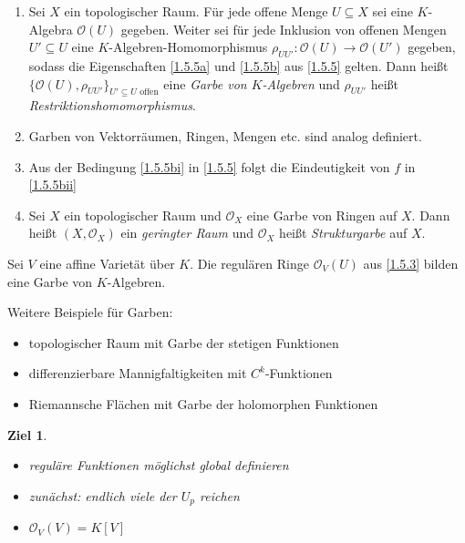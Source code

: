 \documentclass[a4paper,12pt]{scrbook}
\newtheorem{ziel}{Ziel}
\def\O{\mathcal{O}}
\newcommand{\ra}{\longrightarrow}
\begin{document}
\begin{dfn}\label{1.5.6}
  \begin{enumerate}
  \item Sei $X$ ein topologischer Raum. Für jede offene Menge $U\subseteq X$ sei eine $K$-Algebra $\O(U)$ gegeben. Weiter sei
    für jede Inklusion von offenen Mengen $U'\subseteq U$ eine $K$-Algebren-Homomorphismus $\rho_{UU'}\colon\O(U)\ra\O(U')$
    gegeben, sodass die Eigenschaften \ref{1.5.5a} und \ref{1.5.5b} aus \cref{1.5.5} gelten. Dann heißt
    $\{\O(U),\rho_{UU'}\}_{U'\subseteq U\text{ offen}}$ eine \emph{Garbe von $K$-Algebren} und $\rho_{UU'}$ heißt
    \emph{Restriktionshomomorphismus}.
  \item Garben von Vektorräumen, Ringen, Mengen etc. sind analog definiert.
  \item Aus der Bedingung \ref{1.5.5bi} in \cref{1.5.5} folgt die Eindeutigkeit von $f$ in \ref{1.5.5bii}
  \item Sei $X$ ein topologischer Raum und $\O_X$ eine Garbe von Ringen auf $X$. Dann heißt $(X,\O_X)$ ein \emph{geringter Raum}
    und $\O_X$ heißt \emph{Strukturgarbe} auf $X$.
  \end{enumerate}
\end{dfn}

\begin{bem}\label{1.5.7}
  Sei $V$ eine affine Varietät über $K$. Die regulären Ringe $\O_V(U)$ aus \cref{1.5.3} bilden eine Garbe von $K$-Algebren.
\end{bem}

\begin{bsp}\label{1.5.8}
  Weitere Beispiele für Garben:
  \begin{itemize}
  \item topologischer Raum mit Garbe der stetigen Funktionen
  \item differenzierbare Mannigfaltigkeiten mit $C^k$-Funktionen
  \item Riemannsche Flächen mit Garbe der holomorphen Funktionen
  \end{itemize}
\end{bsp}

\begin{ziel}
  \begin{itemize}
  \item reguläre Funktionen möglichst global definieren
  \item zunächst: endlich viele der $U_p$ reichen
  \item $\O_V(V)=K[V]$
  \end{itemize}
\end{ziel}
\end{document}
